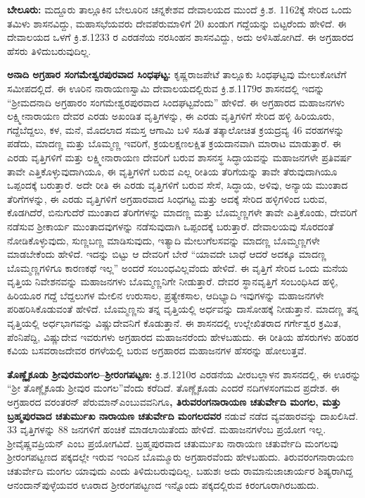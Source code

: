 \textbf{ಬೇಲೂರು:} ಮದ್ದೂರು ತಾಲ್ಲೂಕಿನ ಬೇಲೂರಿನ ಚನ್ನಕೇಶವ ದೇವಾಲಯದ ಮುಂದೆ ಕ್ರಿ.ಶ. 1162ಕ್ಕೆ ಸೇರಿದ ಒಂದು ತಮಿಳು ಶಾಸನವಿದ್ದು, ಮಹಾಸಭೆಯವರು ದೇವಪೆರುಮಾಳಿಗೆ 20 ಖಂಡುಗ ಗದ್ದೆಯನ್ನು ಬಿಟ್ಟರೆಂದು ಹೇಳಿದೆ. ಈ ದೇವಾಲಯದ ಒಳಗೆ ಕ್ರಿ.ಶ.1233 ರ ಎರಡನೆಯ ನರಸಿಂಹನ ಶಾಸನವಿದ್ದು, ಅದು ಅಳಿಸಿಹೋಗಿದೆ. ಈ ಅಗ್ರಹಾರದ ಹೆಸರು ತಿಳಿದುಬರುವುದಿಲ್ಲ.

\textbf{ಅನಾದಿ ಅಗ್ರಹಾರ ಸಂಗಮೇಶ್ವರಪುರವಾದ ಸಿಂಧಘಟ್ಟ:} ಕೃಷ್ಣರಾಜಪೇಟೆ ತಾಲ್ಲೂಕು ಸಿಂಧಘಟ್ಟವು ಮೇಲುಕೋಟೆಗೆ ಸಮೀಪದಲ್ಲಿದೆ. ಈ ಊರಿನ ನಾರಾಯಣಸ್ವಾಮಿ ದೇವಾಲಯದಲ್ಲಿರುವ ಕ್ರಿ.ಶ.1179ರ ಶಾಸನದಲ್ಲಿ ಇದನ್ನು “ಶ‍್ರೀಮದನಾದಿ ಅಗ್ರಹಾರಂ ಸಂಗಮೇಶ್ವರಪುರವಾದ ಸಿಂದಘಟ್ಟವೆಂದು” ಹೇಳಿದೆ. ಈ ಅಗ್ರಹಾರದ ಮಹಾಜನಗಳು ಲಕ್ಷ್ಮೀನಾರಾಯಣ ದೇವರ ಎರಡು ಅಖಂಡಿತ ವೃತ್ತಿಗಳನ್ನು, ಈ ಎರಡು ವೃತ್ತಿಗಳಿಗೆ ಸೇರಿದ ಹಳ್ಳಿ ಹಿರಿಯೂರು, ಗದ್ದೆಬೆದ್ದಲು, ಕಳ, ಮನೆ, ಮೊದಲಾದ ಸಮಸ್ತ ಆಗಾಮಿ ಬಳಿ ಸಹಿತ ತತ್ಕಾಲೋಚಿತ ಕ್ರಯದ್ರವ್ಯ 46 ವರಹಗಳನ್ನು ಪಡೆದು, ಮಾದಣ್ಣ ಮತ್ತು ಬೊಮ್ಮಣ್ಣ ಇವರಿಗೆ, ಕ್ರಯಲಕ್ಷಣಲಕ್ಷಿತ ಕ್ರಯದಾನವಾಗಿ ಮಾರಾಟ ಮಾಡುತ್ತಾರೆ. ಈ ಎರಡು ವೃತ್ತಿಗಳಿಗೆ ಮತ್ತು ಲಕ್ಷ್ಮೀನಾರಾಯಣ ದೇವರಿಗೆ ಬರುವ ಶಾಸನಸ್ಥ ಸಿದ್ಧಾಯವನ್ನು ಮಹಾಜನಗಳೇ ಪ್ರತಿವರ್ಷ ತಾವೇ ಎತ್ತಿಕೊಳ್ಳುವುದಾಗಿಯೂ, ಈ ವೃತ್ತಿಗಳಿಗೆ ಬರುವ ಎಲ್ಲ ರೀತಿಯ ತೆರಿಗೆಯನ್ನು ತಾವೇ ತೆರುವುದಾಗಿಯೂ ಒಪ್ಪಂದಕ್ಕೆ ಬರುತ್ತಾರೆ. ಅದೇ ರೀತಿ ಈ ಎರಡು ವೃತ್ತಿಗಳಿಗೆ ಬರುವ ಸೇಸೆ, ಸಿದ್ಧಾಯ, ಅಳಿವು, ಅನ್ಯಾಯ ಮುಂತಾದ ತೆರಿಗೆಗಳನ್ನು, ಈ ಎರಡು ವೃತ್ತಿಗಳಿಗೆ ಅಗ್ರಹಾರವಾದ ಸಿಂಧಗಟ್ಟ ಮತ್ತು ಅದಕ್ಕೆ ಸೇರಿದ ಹಳ್ಳಿಗಳಿಂದ ಬರುವ, ಕೊಡಗಿದೆರೆ, ಬಿನುಗುದೆರೆ ಮುಂತಾದ ತೆರಿಗೆಗಳನ್ನು ಮಾದಣ್ಣ ಮತ್ತು ಬೊಮ್ಮಣ್ಣಗಳೇ ತಾವೇ ಎತ್ತಿಕೊಂಡು, ದೇವರಿಗೆ ನಡೆಸುವ ಶ‍್ರೀಕಾರ್ಯ ಮುಂತಾದವುಗಳನ್ನು ನಡೆಸುವುದಾಗಿ ಒಪ್ಪಂದಕ್ಕೆ ಬರುತ್ತಾರೆ. ದೇವಾಲಯವು ಸೊರದಂತೆ ನೋಡಿಕೊಳ್ಳುವುದು, ಸುಣ್ಣಬಣ್ಣ ಮಾಡಿಸುವುದು, ಇತ್ಯಾದಿ ಮೇಲುಗೆಲಸವನ್ನು ಮಾದಣ್ಣ ಬೊಮ್ಮಣ್ಣಗಳೇ ಮಾಡಬೇಕೆಂದು ಹೇಳಿದೆ. ಇದನ್ನು ಬಿಟ್ಟು ಆ ದೇವರಿಗೆ ಬೇರೆ “ಯಾವದೇ ಬಾಧೆ ಆದರೆ ಅದಕ್ಕೂ ಮಾದಣ್ಣ ಬೊಮ್ಮಣ್ಣಗಳಿಗೂ ಕಾರಣಕಥೆ ಇಲ್ಲ” ಅಂದರೆ ಸಂಬಂಧವಿಲ್ಲವೆಂದು ಹೇಳಿದೆ. ಈ ವೃತ್ತಿಗೆ ಸೇರಿದ ಒಂದು ಮನೆಯ ವೃತ್ತಿಯ ನಿವೇಶನವನ್ನು ಮಹಾಜನಗಳು ಬೊಮ್ಮಣ್ಣನಿಗೇ ನೀಡುತ್ತಾರೆ. ದೇವರ ಸ್ಥಾನವೃತ್ತಿಗೆ ಸಂಬಂಧಿಸಿದ ಹಳ್ಳಿ, ಹಿರಿಯೂರ ಗದ್ದೆ ಬೆದ್ದಲುಗಳ ಮೇಲಿನ ಉರುಸಾಲ, ಪ್ರತ್ಯೇಕಸಾಲ, ಆದಿಭ್ಯಾದಿ ಇವುಗಳನ್ನು ಮಹಾಜನಗಳೇ ಪರಿಹರಿಸಿಕೊಡುವಂತೆ ಹೇಳಿದೆ. ಬೊಮ್ಮಣ್ಣನು ತನ್ನ ವೃತ್ತಿಯಲ್ಲಿ ಅರ್ಧವನ್ನು ದಾಸೋಹಕ್ಕೆ ನೀಡುತ್ತಾನೆ. ಮಾದಣ್ಣ ತನ್ನ ವೃತ್ತಿಯಲ್ಲಿ ಅರ್ಧಭಾಗವನ್ನು ವಿಷ್ಣುದೇವನಿಗೆ ಕೊಡುತ್ತಾನೆ. ಈ ಶಾಸನದಲ್ಲಿ ಉಲ್ಲೇಖಿತರಾದ ಗರ್ಗೇಶ್ವರ ಕ್ರಮಿತ, ಪೆಂನಿಪೆದ್ದಿ, ವಿಷ್ಣುದೇವ ಇವರುಗಳು ಅಗ್ರಹಾರದ ಮಹಾಜನರೆಂದು ಹೇಳಬಹುದು. ಈ ರೀತಿಯ ಹೆಸರುಗಳು ಹರಿಹರ ಕವಿಯ ಬಸವರಾಜದೇವರ ರಗಳೆಯಲ್ಲಿ ಬರುವ ಅಗ್ರಹಾರದ ಮಹಾಜನಗಳ ಹೆಸರನ್ನು ಹೋಲುತ್ತವೆ.

\textbf{ತೊಣ್ಣೈಕೂಡು ಶ‍್ರೀವುರಮಂಗಲ–ಶ‍್ರೀರಂಗಪಟ್ಟಣ:} ಕ್ರಿ.ಶ.1210ರ ಎರಡನೆಯ ವೀರಬಲ್ಲಾಳನ ಶಾಸನದಲ್ಲಿ, ಈ ಊರನ್ನು “ಶ‍್ರೀ ತೊಣ್ಣೈಕೂಡು ಶ‍್ರೀವುರ ಮಂಗಲ”ವೆಂದು ಕರೆದಿದೆ. ತೊಣ್ಣೈಕೂಡು ಎಂದರೆ ನದಿಗಳಸಂಗಮದ ಪ್ರದೇಶ. ಈ ಅಗ್ರಹಾರದ ವರಂತರನ್​ ಪೆರುಮಾನ್​ ಎಂಬುವವನಿಗೂ\textbf{, ತಿರುವರಂಗನಾರಾಯಣ ಚತುರ್ವೇದಿ ಮಂಗಲ, ಮತ್ತು ಬ್ರಹ್ಮಪುರವಾದ ಚತುರ್ಮುಖ ನಾರಾಯಣ ಚತುರ್ವೇದಿ ಮಂಗಲದವರ} ನಡುವೆ ನಡೆದ ವ್ಯವಹಾರವನ್ನು ದಾಖಲಿಸಿದೆ. 33 ವೃತ್ತಿಗಳನ್ನು 88 ಜನಗಳಿಗೆ ಹಂಚಿಕೆ ಮಾಡಲಾಯಿತೆಂದು ಹೇಳಿದೆ. ಮಹಾಜನಗಳೆಂಬ ಪ್ರಯೋಗ ಇಲ್ಲ. ಶ‍್ರೀವೈಷ್ಣವಪ್ರಿಯನ್​ ಎಂಬ ಪ್ರಯೋಗವಿದೆ. ಬ್ರಹ್ಮಪುರವಾದ ಚತುರ್ಮುಖ ನಾರಾಯಣ ಚತುರ್ವೇದಿ ಮಂಗಲವು ಶ‍್ರೀರಂಗಪಟ್ಟಣದ ಪಕ್ಕದಲ್ಲೇ ಇರುವ ಇಂದಿನ ಬೊಮ್ಮೂರು ಅಗ್ರಹಾರವೆಂದು ಹೇಳಬಹುದು. ತಿರುವರಂಗನಾರಾಯಣ ಚತುರ್ವೇದಿ ಮಂಗಲ ಯಾವುದು ಎಂದು ತಿಳಿದುಬರುವುದಿಲ್ಲ. ಬಹುಶಃ ಅದು ರಾಮಾನುಜಾಚಾರ್ಯರ ಶಿಷ್ಯರಾಗಿದ್ದ ಆನಂದಾನ್​ಪುಳ್ಳೆಯವರ ಊರಾದ ಶ‍್ರೀರಂಗಪಟ್ಟಣದ ಇನ್ನೊಂದು ಪಕ್ಕದಲ್ಲಿರುವ ಕಿರಂಗೂರಾಗಿರಬಹುದು. 

